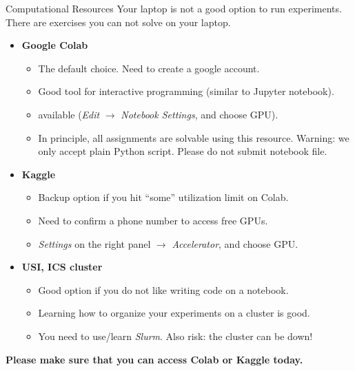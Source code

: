 \begin{frame}{Computational Resources}
\vspace{-5mm}
Your laptop is not a good option to run experiments. There are exercises you can not solve on your laptop.
\vsp
\pause
\begin{itemize}
\item \textbf{Google Colab} 
\begin{itemize}
\item The default choice. Need to create a google account.
\item Good tool for interactive programming (similar to Jupyter notebook).\\
\item {} available (\textit{Edit} $\rightarrow$ \textit{Notebook Settings}, and choose GPU).\\
\item In principle, all assignments are solvable using this resource. Warning: we only accept plain Python script. Please do not submit notebook file.
\end{itemize}
\vsp
\pause
\item \textbf{Kaggle} 
\begin{itemize}
\item Backup option if you hit ``some'' utilization limit on Colab.
\item Need to confirm a phone number to access free GPUs.
\item \textit{Settings} on the right panel $\rightarrow$ \textit{Accelerator}, and choose GPU.\\
\end{itemize}
\vsp
\pause
\item \textbf{USI, ICS cluster} 
\begin{itemize}
\item Good option if you do not like writing code on a notebook. 
\item Learning how to organize your experiments on a cluster is good.
\item You need to use/learn \textit{Slurm}. Also risk: the cluster can be down!
\end{itemize}
\end{itemize}
\vsp
\textbf{Please make sure that you can access Colab or Kaggle today.}
\end{frame}

